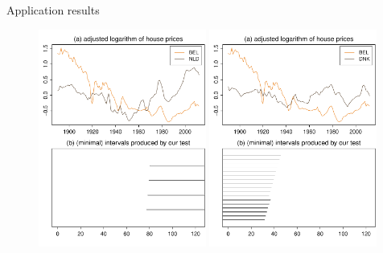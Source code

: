 \documentclass[10pt, handout]{beamer}
\begin{document}
%
\begin{frame}{Application results}
	\begin{figure}
		\includegraphics[width=0.49\textwidth]{plots/hp_BEL_NLD_talk}
		\hfill
		\includegraphics[width=0.49\textwidth]{plots/hp_BEL_DNK_talk}
	\end{figure}
\end{frame}
\end{document}
